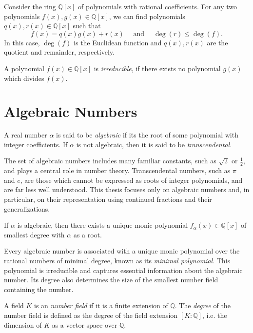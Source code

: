 \begin{example}
  Consider the ring $ℚ[x]$ of polynomials with rational coefficients.
  For any two polynomials $f(x), g(x) ∈ ℚ[x]$,
  we can find polynomials $q(x), r(x) ∈ ℚ[x]$ such that
  \[
    f(x) = q(x) g(x) + r(x)
    \quad
    \text{ and }
    \quad
    \deg(r) ≤ \deg(f).
  \]
  In this case, $\deg(f)$ is the Euclidean function and $q(x), r(x)$ are
  the quotient and remainder, respectively.
\end{example}

\begin{definition}
  A polynomial $f(x) ∈ ℚ[x]$ is \emph{irreducible},
  if there exists no polynomial $g(x)$ which divides $f(x)$.
\end{definition}

\section{Algebraic Numbers}

\begin{definition}
  A real number $α$ is said to be \emph{algebraic} if its the root of some polynomial
  with integer coefficients.
  If $α$ is not algebraic, then it is said to be \emph{transcendental}.
\end{definition}

The set of algebraic numbers includes many familiar constants, such as $\sqrt{2}$ or $\frac{1}{2}$,
and plays a central role in number theory.
Transcendental numbers, such as $\pi$ and $e$, are those which cannot be expressed
as roots of integer polynomials, and are far less well understood.
This thesis focuses only on algebraic numbers and, in particular, on their
representation using continued fractions and their generalizations.

\begin{lemma}
  If $α$ is algebraic, then there exists a unique monic polynomial $f_α(x) ∈ ℚ[x]$
  of smallest degree with $α$ as a root.
\end{lemma}

Every algebraic number is associated with a unique monic polynomial over the rational numbers
of minimal degree, known as its \emph{minimal polynomial}.
This polynomial is irreducible and captures essential information about the algebraic number.
Its degree also determines the size of the smallest number field containing the number.

\begin{definition}
  A field $K$ is an \emph{number field} if it is a finite extension of $ℚ$.
  The \emph{degree} of the number field is defined as the degree of the field
  extension $[K : ℚ]$, i.e. the dimension of $K$ as a vector space over $ℚ$.
\end{definition}

